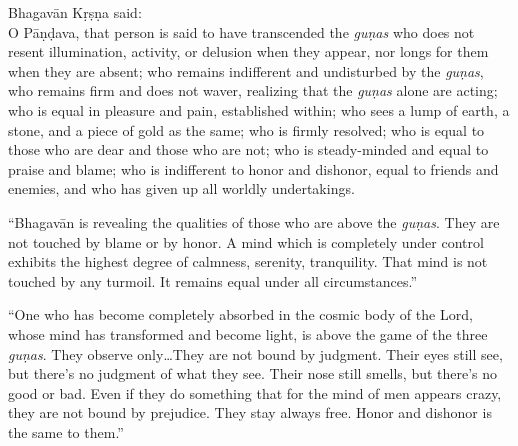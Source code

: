 {\hspace*{1em}Bhagavān Kṛṣṇa said: \\
O Pāṇḍava, that person is said to have transcended the \textit{guṇas} who does not resent illumination, activity, or delusion when they appear, nor longs for them when they are absent; who remains indifferent and undisturbed by the \textit{guṇas}, who remains firm and does not waver, realizing that the \textit{guṇas} alone are acting; who is equal in pleasure and pain, established within; who sees a lump of earth, a stone, and a piece of gold as the same; who is firmly resolved; who is equal to those who are dear and those who are not; who is steady-minded and equal to praise and blame; who is indifferent to honor and dishonor, equal to friends and enemies, and who has given up all worldly undertakings.}


\enquote{Bhagavān is revealing the qualities of those who are above the \textit{guṇas}. They are not touched by blame or by honor. A mind which is completely under control exhibits the highest degree of calmness, serenity, tranquility. That mind is not touched by any turmoil. It remains equal under all circumstances.}

\enquote{One who has become completely absorbed in the cosmic body of the Lord, whose mind has transformed and become light, is above the game of the three \textit{guṇas}. They observe only\ldots They are not bound by judgment. Their eyes still see, but there’s no judgment of what they see. Their nose still smells, but there’s no good or bad. Even if they do something that for the mind of men appears crazy, they are not bound by prejudice. They stay always free. Honor and dishonor is the same to them.}

